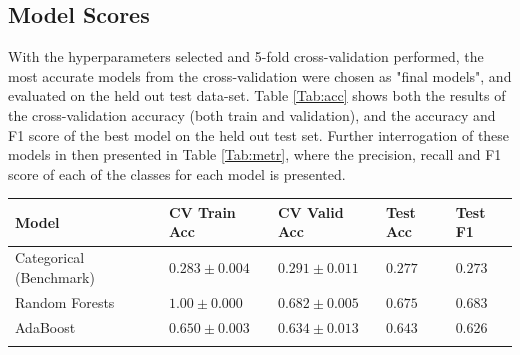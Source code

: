 \documentclass{bioinfo}
\begin{document}


\subsection{Model Scores}
With the hyperparameters selected and 5-fold cross-validation performed, the most accurate models from the cross-validation were chosen as "final models", and evaluated on the held out test data-set. 
Table \ref{Tab:acc} shows both the results of the cross-validation accuracy (both train and validation), and the accuracy and F1 score of the best model on the held out test set.
Further interrogation of these models in then presented in Table \ref{Tab:metr}, where the precision, recall and F1 score of each of the classes for each model is presented.

\begin{table}[!h]
 {\begin{tabular}{@{}lllll@{}}\toprule Model  & CV Train Acc & CV Valid Acc  & Test Acc & Test F1 \\\midrule
Categorical (Benchmark) & $0.283 \pm 0.004$ & $0.291 \pm 0.011$ & $0.277$ & $0.273$ \\
Random Forests  &  $1.00 \pm 0.000$  &  $0.682 \pm 0.005$ & $0.675$ & $0.683$\\
AdaBoost  & $0.650 \pm 0.003$ & $0.634 \pm 0.013$ & $0.643$ & $0.626$\\\botrule
\end{tabular}}{}
\end{table}
\end{document}
